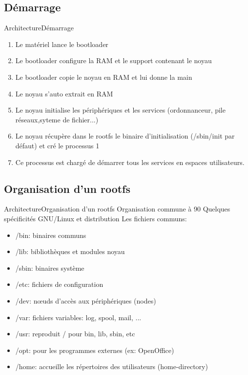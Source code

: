 \subsection{Démarrage}
\begin{frame}{Architecture}{Démarrage}
	\begin{enumerate}
		\item
			Le matériel lance le bootloader
		\item
			Le bootloader configure la RAM et le support contenant le noyau 
		\item
			Le bootloader copie le noyau en RAM et lui donne la main
		\item
			Le noyau s'auto extrait en RAM
		\item
			Le noyau initialise les périphériques et les services (ordonnanceur, pile réseaux,syteme de fichier...)
		\item
			Le noyau récupère dans le rootfs le binaire d'initialisation (/sbin/init par défaut) et cré le processus 1
		\item
			Ce processus est chargé de démarrer tous les services en espaces utilisateurs.
	\end{enumerate}
\end{frame}

\subsection{Organisation d'un rootfs}
\begin{frame}{Architecture}{Organisation d'un rootfs}
	Organisation commune à 90%
	Quelques spécificités GNU/Linux et distribution
	Les fichiers communs:
	\begin{itemize}
		\item
			/bin: binaires communs
		\item
			/lib: bibliothèques et modules noyau
		\item
			/sbin: binaires système
		\item
			/etc: fichiers de configuration
		\item
			/dev: nœuds d'accès aux périphériques (nodes)
		\item
			/var: fichiers variables: log, spool, mail, ...
		\item
			/usr: reproduit / pour bin, lib, sbin, etc
		\item
			/opt: pour les programmes externes (ex: OpenOffice)
		\item
			/home: accueille les répertoires des utilisateurs (home-directory)
	\end{itemize}
\end{frame}


